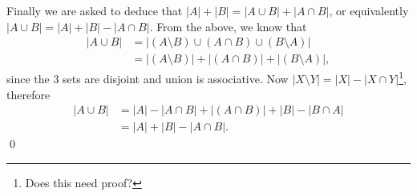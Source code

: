 \documentclass[12pt]{article}
\begin{document}
\begin{mdframed}
Finally we are asked to deduce that $|A| + |B| = |A \cup B| + |A \cap B|$, or
equivalently $|A \cup B| = |A| + |B| - |A \cap B|$. From the above, we know
that
\begin{align*}
  |A \cup B| &= |(A \setminus B) \cup (A \cap B) \cup (B \setminus A)|\\
             &= |(A \setminus B)| + |(A \cap B)| + |(B \setminus A)|,
\end{align*}
since the 3 sets are disjoint and union is associative. Now
$|X \setminus Y| = |X| - |X \cap Y|$\footnote{Does this need proof?}, therefore
\begin{align*}
  |A \cup B| &= |A| - |A \cap B| + |(A \cap B)| + |B| - |B \cap A|\\
             &= |A| + |B| - |A \cap B|.
\end{align*}
\qed
\end{mdframed}

\newpage
\end{document}
